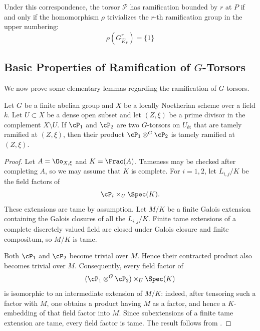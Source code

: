 Under this correspondence, the torsor $\mathcal{P}$ has ramification bounded by $r$ at $P$
if and only if the homomorphism $\rho$ trivializes the $r$-th ramification group in the upper numbering:
\[ \rho(G_{\widehat{K}_P}^r) = \{ 1 \} \]

\subsection*{Basic Properties of Ramification of \texorpdfstring{$G$-Torsors}{G-Torsors}}
We now prove some elementary lemmas regarding the ramification of $G$-torsors.
\begin{lemma}\label{lemma:bounding_ramification_of_contracted_product}
    Let $G$ be a finite abelian group and $X$ be a locally Noetherian scheme over a field $k$.
    Let $U \subset X$ be a dense open subset and let $(Z, \xi)$ be a prime divisor in the complement $X \setminus U$.
    If $\cP_1$ and $\cP_2$ are two $G$-torsors on $U_{\text{ét}}$ that are tamely ramified at $(Z, \xi)$, then their product
    $\cP_1 \otimes^G \cP_2$ is tamely ramified at $(Z, \xi)$.
\end{lemma}
\begin{proof}
    Let $A=\Oo_{X,\xi}$ and $K=\Frac(A)$. Tameness may be checked after
    completing $A$, so we may assume that $K$ is complete. For $i=1,2$, let
    $L_{i,j}/K$ be the field factors of
    \[
        \cP_i\times_U\Spec(K).
    \]
    These extensions are tame by assumption. Let $M/K$ be a finite Galois
    extension containing the Galois closures of all the $L_{i,j}/K$. Finite
    tame extensions of a complete discretely valued field are closed under
    Galois closure and finite compositum, so $M/K$ is tame.

    Both $\cP_1$ and $\cP_2$ become trivial over $M$. Hence their contracted
    product also becomes trivial over $M$. Consequently, every field factor of
    \[
        (\cP_1\otimes^G\cP_2)\times_U\Spec(K)
    \]
    is isomorphic to an intermediate extension of $M/K$: indeed, after tensoring
    such a factor with $M$, one obtains a product having $M$ as a factor, and
    hence a $K$-embedding of that field factor into $M$. Since subextensions of
    a finite tame extension are tame, every field factor is tame. The result
    follows from .
\end{proof}

